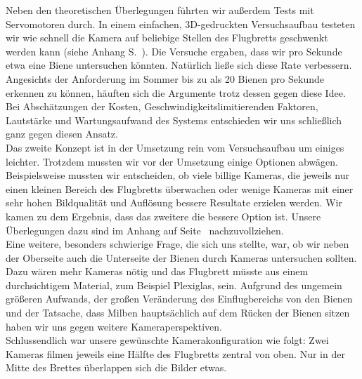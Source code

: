 \documentclass[11pt,a4paper]{article}
\begin{document}
Neben den theoretischen Überlegungen führten wir außerdem Tests mit Servomotoren durch. In einem einfachen, 3D-gedruckten Versuchsaufbau testeten wir wie schnell die Kamera auf beliebige Stellen des Flugbretts geschwenkt werden kann (siehe Anhang S. \pageref*{fig:mechanics-test}\,). Die Versuche ergaben, dass wir pro Sekunde etwa eine Biene untersuchen könnten. Natürlich ließe sich diese Rate verbessern. Angesichts der Anforderung im Sommer bis zu als 20 Bienen pro Sekunde erkennen zu können, häuften sich die Argumente trotz dessen gegen diese Idee. Bei Abschätzungen der Kosten, Geschwindigkeitslimitierenden Faktoren, Lautstärke und Wartungsaufwand des Systems entschieden wir uns schließlich ganz gegen diesen Ansatz.\\
Das zweite Konzept ist in der Umsetzung rein vom Versuchsaufbau um einiges leichter. Trotzdem mussten wir vor der Umsetzung einige Optionen abwägen. Beispielsweise mussten wir entscheiden, ob viele billige Kameras, die jeweils nur einen kleinen Bereich des Flugbretts überwachen oder wenige Kameras mit einer sehr hohen Bildqualität und Auflösung bessere Resultate erzielen werden. Wir kamen zu dem Ergebnis, dass das zweitere die bessere Option ist. Unsere Überlegungen dazu sind im Anhang auf Seite \pageref*{fig:moving-cameras-considerations} \, nachzuvollziehen.\\
Eine weitere, besonders schwierige Frage, die sich uns stellte, war, ob wir neben der Oberseite auch die Unterseite der Bienen durch Kameras untersuchen sollten. Dazu wären mehr Kameras nötig und das Flugbrett müsste aus einem durchsichtigem Material, zum Beispiel Plexiglas, sein. 	Aufgrund des ungemein größeren Aufwands, der großen Veränderung des Einflugbereichs von den Bienen und der Tatsache, dass Milben hauptsächlich auf dem Rücken der Bienen sitzen haben wir uns gegen weitere Kameraperspektiven.\\
Schlussendlich war unsere gewünschte Kamerakonfiguration wie folgt: Zwei Kameras filmen jeweils eine Hälfte des Flugbretts zentral von oben. Nur in der Mitte des Brettes überlappen sich die Bilder etwas.
\end{document}
